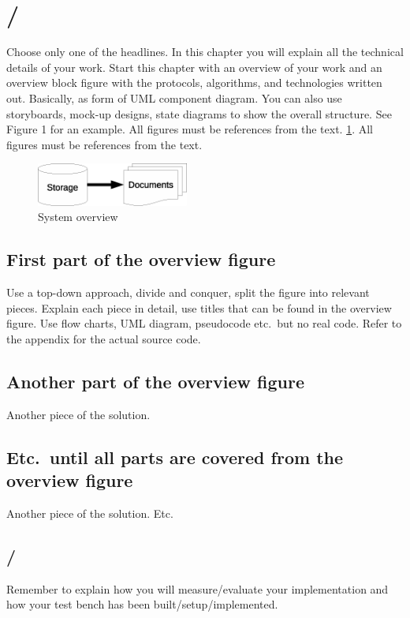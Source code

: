 \section{/}\label{sec:implementation} 
Choose only one of the headlines. In this chapter you will explain all the technical details of your
work. Start this chapter with an overview of your work and an overview block figure with the
protocols, algorithms, and technologies written out. Basically, as form of UML component diagram.
You can also use storyboards, mock-up designs, state diagrams to show the overall structure. See
Figure 1 for an example. All figures must be references from the text. 
\cref{fig:overview}. All figures must be references from the text.

\begin{figure}
  \includegraphics[width=5cm]{Figures/Latex_figure1.eps}
  \caption{System overview}\label{fig:overview}
\end{figure}

\subsection{First part of the overview figure}\label{subsec:overview1}
Use a top-down approach, divide and conquer, split the figure into relevant pieces. Explain each
piece in detail, use titles that can be found in the overview figure. Use flow charts, UML diagram,
pseudocode etc.\ but no real code. Refer to the appendix for the actual source code.

\subsection{Another part of the overview figure}\label{subsec:overview2}
Another piece of the solution.

\subsection{Etc.\ until all parts are covered from the overview figure}
Another piece of the solution. Etc.\

\subsection{/
            }\label{subsec:eval_setup} 

Remember to explain how you will measure/evaluate your implementation and how your test bench has
been built/setup/implemented.
